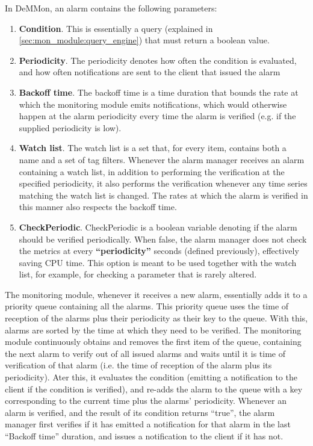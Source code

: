 In DeMMon, an alarm contains the following parameters: 

\begin{enumerate}
    \item \textbf{Condition}. This is essentially a query (explained in \ref{sec:mon_module:query_engine}) that must return a boolean value.
    
    \item \textbf{Periodicity}. The periodicity denotes how often the condition is evaluated, and how often notifications are sent to the client that issued the alarm
    
    \item \textbf{Backoff time}. The backoff time is a time duration that bounds the rate at which the monitoring module emits notifications, which would otherwise happen at the alarm periodicity every time the alarm is verified (e.g. if the supplied periodicity is low).
    
    \item \textbf{Watch list}. The watch list is a set that, for every item, contains both a name and a set of tag filters. Whenever the alarm manager receives an alarm containing a watch list, in addition to performing the verification at the specified periodicity, it also performs the verification whenever any time series matching the watch list is changed. The rates at which the alarm is verified in this manner also respects the backoff time.
    
    \item \textbf{CheckPeriodic}. CheckPeriodic is a boolean variable denoting if the alarm should be verified periodically. When false, the alarm manager does not check the metrics at every \textbf{``periodicity''} seconds (defined previously), effectively saving CPU time. This option is meant to be used together with the watch list, for example, for checking a parameter that is rarely altered.
    
\end{enumerate}

The monitoring module, whenever it receives a new alarm, essentially adds it to a priority queue containing all the alarms. This priority queue uses the time of reception of the alarms plus their periodicity as their key to the queue. With this, alarms are sorted by the time at which they need to be verified. The monitoring module continuously obtains and removes the first item of the queue, containing the next alarm to verify out of all issued alarms and waits until it is time of verification of that alarm (i.e. the time of reception of the alarm plus its periodicity). Ater this, it evaluates the condition (emitting a notification to the client if the condition is verified), and re-adds the alarm to the queue with a key corresponding to the current time plus the alarms' periodicity. Whenever an alarm is verified, and the result of its condition returns ``true'', the alarm manager first verifies if it has emitted a notification for that alarm in the last ``Backoff time'' duration, and issues a notification to the client if it has not.